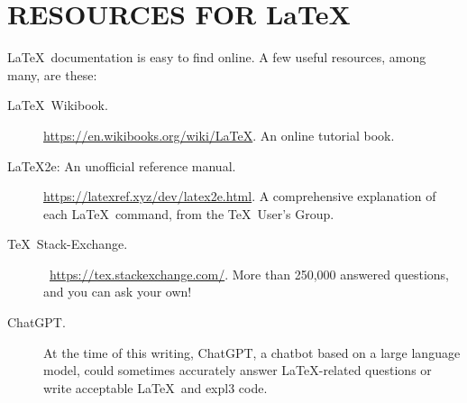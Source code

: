 \documentclass[11pt]{article}
\begin{document}
\section[RESOURCES FOR LATEX]{RESOURCES FOR \LaTeX}
\LaTeX\ documentation is easy to find online. A few useful resources, among many, are these:
\begin{description}
\item[\LaTeX\ Wikibook.] \url{https://en.wikibooks.org/wiki/LaTeX}. An online tutorial book.
\item[\LaTeX 2e: An unofficial reference manual.] \url{https://latexref.xyz/dev/latex2e.html}. A comprehensive explanation of each \LaTeX\ command, from the \TeX\ User's Group. 
\item[\TeX\ Stack-Exchange.]\ \url{https://tex.stackexchange.com/}. More than 250,000 answered questions, and you can ask your own!
\item[ChatGPT.] At the time of this writing, ChatGPT, a chatbot based on a large language model, could sometimes accurately answer \LaTeX-related questions or write acceptable \LaTeX\ and expl3 code.
\end{description}

\vskip 30pt

\end{document}
